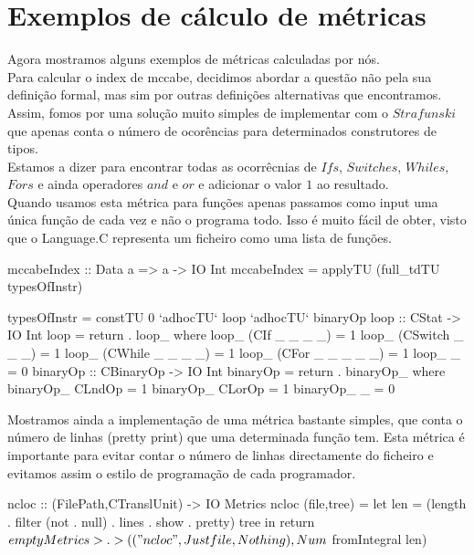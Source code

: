\section{Exemplos de cálculo de métricas}
Agora mostramos alguns exemplos de métricas calculadas por nós.\\
Para calcular o index de mccabe, decidimos abordar a questão não pela sua definição formal, mas sim por outras
definições alternativas que encontramos. Assim, fomos por uma solução muito simples de implementar com o
$Strafunski$ que apenas conta o número de ocorências para determinados construtores de tipos.\\
Estamos a dizer para encontrar todas as ocorrêcnias de $Ifs$, $Switches$, $Whiles$, $Fors$ e ainda operadores $and$ e $or$ e adicionar o valor
$1$ ao resultado.\\

Quando usamos esta métrica para funções apenas passamos como input uma única função de cada vez e não o programa todo. Isso
é muito fácil de obter, visto que o Language.C representa um ficheiro como uma lista de funções.

\begin{haskell}
mccabeIndex :: Data a => a -> IO Int
mccabeIndex = applyTU (full_tdTU typesOfInstr)

typesOfInstr = constTU 0
  `adhocTU` loop
  `adhocTU` binaryOp
loop :: CStat -> IO Int
loop = return . loop_
  where loop_ (CIf _ _ _ _)    = 1
        loop_ (CSwitch _ _ _)  = 1
        loop_ (CWhile _ _ _ _) = 1
        loop_ (CFor _ _ _ _ _) = 1
        loop_ _                = 0
        binaryOp :: CBinaryOp -> IO Int
        binaryOp = return . binaryOp_
          where binaryOp_ CLndOp = 1
                binaryOp_ CLorOp  = 1
                binaryOp_ _      = 0
\end{haskell}

Mostramos ainda a implementação de uma métrica bastante simples, que conta o número de linhas (pretty print) que uma determinada
função tem. Esta métrica é importante para evitar contar o número de linhas directamente do ficheiro e evitamos assim
o estilo de programação de cada programador.

\begin{haskell}
ncloc :: (FilePath,CTranslUnit) -> IO Metrics
ncloc (file,tree) =
  let len = (length . filter (not . null) . lines . show . pretty) tree
  in return $ emptyMetrics
       >.> (("ncloc",Just file,Nothing),Num $ fromIntegral len)
\end{haskell}

